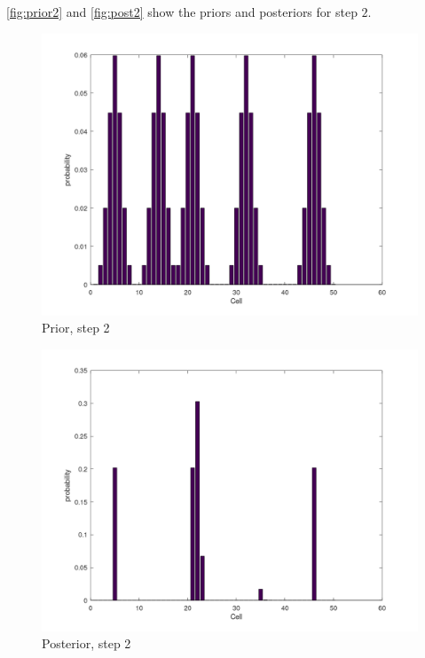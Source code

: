 \documentclass[11pt]{article}
\begin{document}
        \autoref{fig:prior2} and \autoref{fig:post2} show the priors and posteriors for step $2$.
        \begin{figure}[H]
            \centering
            \includegraphics[width=1.0\textwidth]{../images/prior2v2}
            \caption{Prior, step 2}
            \label{fig:prior2}
        \end{figure}
        \begin{figure}[H]
            \centering
            \includegraphics[width=1.0\textwidth]{../images/posterior2v2}
            \caption{Posterior, step 2}
            \label{fig:post2}
        \end{figure}
\end{document}
